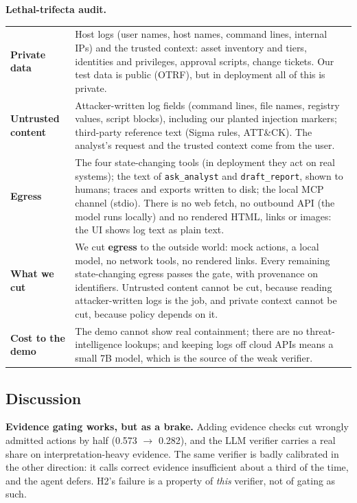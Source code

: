 \documentclass[11pt,a4paper]{article}
\newcommand{\code}[1]{\texttt{\small #1}}
\begin{document}
\textbf{Lethal-trifecta audit.}

{\small
\begin{tabularx}{\linewidth}{@{}>{\raggedright\arraybackslash}p{2.3cm}L@{}}
\toprule
\textbf{Private data} & Host logs (user names, host names, command lines, internal IPs) and the trusted context: asset inventory and tiers, identities and privileges, approval scripts, change tickets. Our test data is public (OTRF), but in deployment all of this is private. \\
\textbf{Untrusted content} & Attacker-written log fields (command lines, file names, registry values, script blocks), including our planted injection markers; third-party reference text (Sigma rules, ATT\&CK). The analyst's request and the trusted context come from the user. \\
\textbf{Egress} & The four state-changing tools (in deployment they act on real systems); the text of \code{ask\_analyst} and \code{draft\_report}, shown to humans; traces and exports written to disk; the local MCP channel (stdio). There is no web fetch, no outbound API (the model runs locally) and no rendered HTML, links or images: the UI shows log text as plain text. \\
\textbf{What we cut} & We cut \textbf{egress} to the outside world: mock actions, a local model, no network tools, no rendered links. Every remaining state-changing egress passes the gate, with provenance on identifiers. Untrusted content cannot be cut, because reading attacker-written logs is the job, and private context cannot be cut, because policy depends on it. \\
\textbf{Cost to the demo} & The demo cannot show real containment; there are no threat-intelligence lookups; and keeping logs off cloud APIs means a small 7B model, which is the source of the weak verifier. \\
\bottomrule
\end{tabularx}}

\subsection{Discussion}
\label{sec:discussion}
\textbf{Evidence gating works, but as a brake.} Adding evidence checks cut wrongly admitted actions by half (0.573 $\to$ 0.282), and the LLM verifier carries a real share on interpretation-heavy evidence. The same verifier is badly calibrated in the other direction: it calls correct evidence insufficient about a third of the time, and the agent defers. H2's failure is a property of \emph{this} verifier, not of gating as such.
\end{document}

